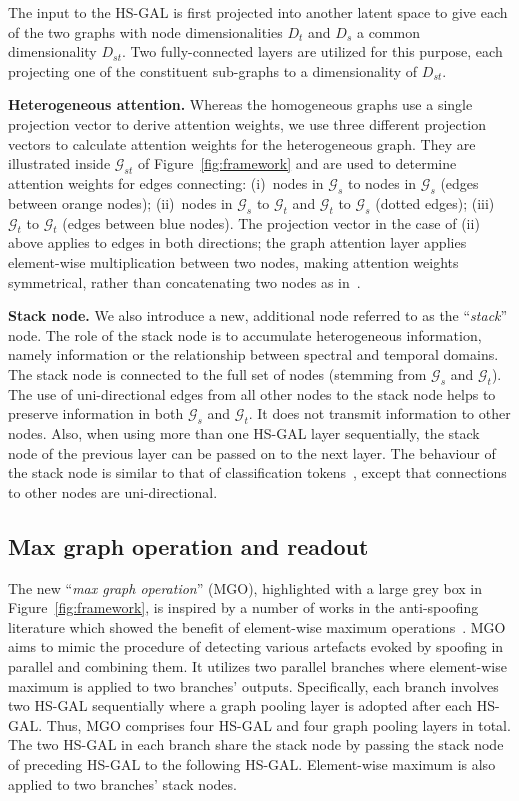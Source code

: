 \documentclass{article}
\newcommand{\newpara}[1]{\vspace{8pt}\noindent\textbf{#1}}
\begin{document}
The input to the HS-GAL is first projected into another latent space to give each of the two graphs with node dimensionalities $D_t$ and $D_s$ a common dimensionality $D_{st}$.
Two fully-connected layers are utilized for this purpose, each projecting one of the constituent sub-graphs to a dimensionality of $D_{st}$.

\newpara{Heterogeneous attention.}
Whereas the homogeneous graphs use a single projection vector to derive attention weights, we use three different projection vectors to calculate attention weights for the heterogeneous graph.  
They are illustrated inside $\mathcal{G}_{st}$ of Figure~\ref{fig:framework} and are used to determine attention weights for edges connecting: 
(i)~nodes in $\mathcal{G}_{s}$ to nodes in $\mathcal{G}_{s}$ (edges between orange nodes); 
(ii)~nodes in $\mathcal{G}_{s}$ to $\mathcal{G}_{t}$ and $\mathcal{G}_{t}$ to $\mathcal{G}_{s}$ (dotted edges); 
(iii)~$\mathcal{G}_{t}$ to $\mathcal{G}_{t}$ (edges between blue nodes). 
The projection vector in the case of (ii) above applies to edges in both directions; the graph attention layer applies element-wise multiplication between two nodes, making attention weights symmetrical, rather than concatenating two nodes as in~\cite{velickovic2018graph}. 

\newpara{Stack node.}
We also introduce a new, additional node referred to as the ``{\em stack}'' node.
The role of the stack node is to accumulate heterogeneous information, namely information or the relationship between spectral and temporal domains. 
The stack node is connected to the full set of nodes (stemming from $\mathcal{G}_s$ and $\mathcal{G}_t$). 
The use of uni-directional edges from all other nodes to the stack node helps to preserve information in both $\mathcal{G}_s$ and $\mathcal{G}_t$.
It does not transmit information to other nodes. 
Also, when using more than one HS-GAL layer sequentially, the stack node of the previous layer can be passed on to the next layer. 
The behaviour of the stack node is similar to that of classification tokens~\cite{kenton2019bert}, except that connections to other nodes are uni-directional.

\subsection{Max graph operation and readout}
\label{ssec:MgoReadout}
The new ``{\em max graph operation}'' (MGO), highlighted with a large grey box in Figure~\ref{fig:framework}, is inspired by a number of works in the anti-spoofing literature which showed the benefit of element-wise maximum operations~\cite{lavrentyeva2017audio,tak2021end}. 
MGO aims to mimic the procedure of detecting various artefacts evoked by spoofing in parallel and combining them.
It utilizes two parallel branches where element-wise maximum is applied to two branches' outputs. 
Specifically, each branch involves two HS-GAL sequentially where a graph pooling layer is adopted after each HS-GAL.
Thus, MGO comprises four HS-GAL and four graph pooling layers in total. 
The two HS-GAL in each branch share the stack node by passing the stack node of preceding HS-GAL to the following HS-GAL. 
Element-wise maximum is also applied to two branches' stack nodes.
\end{document}
